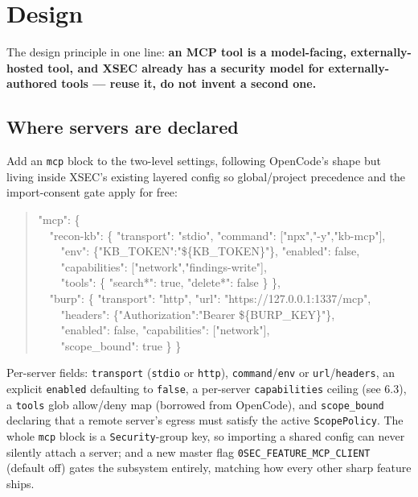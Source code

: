 \documentclass[11pt]{article}
\begin{document}
\section{Design}

The design principle in one line: \textbf{an MCP tool is a model-facing,
externally-hosted tool, and XSEC already has a security model for
externally-authored tools --- reuse it, do not invent a second one.}

\subsection{Where servers are declared}

Add an \texttt{mcp} block to the two-level settings, following OpenCode's shape
but living inside XSEC's existing layered config so global/project precedence and
the import-consent gate apply for free:

\begin{quote}
\ttfamily
"mcp": \{\\
\ \ "recon-kb": \{ "transport": "stdio", "command": ["npx","-y","kb-mcp"],\\
\ \ \ \ "env": \{"KB\_TOKEN":"\$\{KB\_TOKEN\}"\}, "enabled": false,\\
\ \ \ \ "capabilities": ["network","findings-write"],\\
\ \ \ \ "tools": \{ "search*": true, "delete*": false \} \},\\
\ \ "burp": \{ "transport": "http", "url": "https://127.0.0.1:1337/mcp",\\
\ \ \ \ "headers": \{"Authorization":"Bearer \$\{BURP\_KEY\}"\},\\
\ \ \ \ "enabled": false, "capabilities": ["network"],\\
\ \ \ \ "scope\_bound": true \} \}
\end{quote}

Per-server fields: \texttt{transport} (\texttt{stdio} or \texttt{http}),
\texttt{command}/\texttt{env} or \texttt{url}/\texttt{headers}, an explicit
\texttt{enabled} defaulting to \texttt{false}, a per-server \texttt{capabilities}
ceiling (see 6.3), a \texttt{tools} glob allow/deny map (borrowed from OpenCode),
and \texttt{scope\_bound} declaring that a remote server's egress must satisfy
the active \texttt{ScopePolicy}. The whole \texttt{mcp} block is a
\texttt{Security}-group key, so importing a shared config can never silently
attach a server; and a new master flag \texttt{0SEC\_FEATURE\_MCP\_CLIENT}
(default off) gates the subsystem entirely, matching how every other sharp
feature ships.
\end{document}
